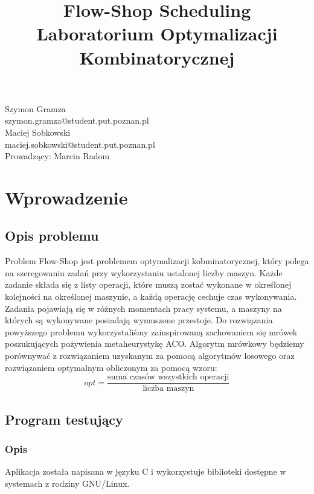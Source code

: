 \documentclass[10pt,a4paper]{article}
\title{Flow-Shop Scheduling\\Laboratorium Optymalizacji Kombinatorycznej}
\begin{document}
\maketitle
\begin{center}
\Large{Szymon Gramza}\\
szymon.gramza@student.put.poznan.pl\\
\vspace{4mm}
\Large{Maciej Sobkowski}\\
maciej.sobkowski@student.put.poznan.pl\\
\vspace{5mm}
\Large{Prowadzący: Marcin Radom}\\  
\end{center}


\vspace{10mm}
\section{Wprowadzenie}
\subsection{Opis problemu}
Problem Flow-Shop jest problemem optymalizacji kobminatorycznej, który polega na
szeregowaniu zadań przy wykorzystaniu ustalonej liczby maszyn. Każde zadanie
składa się z listy operacji, które muszą zostać wykonane w określonej kolejności
na określonej maszynie, a każdą operację cechuje czas wykonywania. Zadania
pojawiają się w różnych momentach pracy systemu, a maszyny na których są
wykonywane posiadają wymuszone przestoje.  Do rozwiązania powyższego problemu
wykorzystaliśmy zainspirowaną zachowaniem się mrówek poszukujących pożywienia
metaheurystykę ACO\@. Algorytm mrówkowy będziemy porównywać z rozwiązaniem
uzyskanym za pomocą algorytmów losowego oraz rozwiązaniem optymalnym obliczonym
za pomocą wzoru: 
\begin{equation}
  opt = \frac{\text{suma\ czasów\ wszystkich\ operacji}}{\text{liczba\ maszyn}}
\end{equation}

\subsection{Program testujący}

\subsubsection{Opis}
Aplikacja została napisana w języku C i wykorzystuje biblioteki dostępne w
systemach z rodziny GNU/Linux. 
\end{document}
